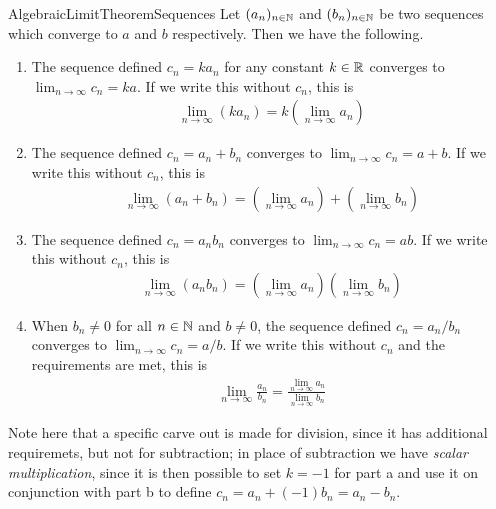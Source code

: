 \documentclass[11pt]{article}
\begin{document}
\begin{label theorem}{AlgebraicLimitTheoremSequences}
Let $(a_n)_{n\in \mathbb{N}}$ and $(b_n)_{n\in \mathbb{N}}$ be two sequences which converge to $a$ and $b$ respectively. Then we have the following. \begin{enumerate}
\item The sequence defined $c_n = k a_n$ for any constant $k \in \mathbb{R}$ converges to $\lim_{n \to \infty} c_n = ka$. If we write this without $c_n$, this is \begin{gather*}
\lim_{n \to \infty} (k a_n) = k \left( \lim_{n \to \infty} a_n \right)
\end{gather*}
\item The sequence defined $c_n = a_n + b_n$ converges to $\lim_{n \to \infty} c_n = a + b$. If we write this without $c_n$, this is \begin{gather*}
\lim_{n \to \infty} (a_n + b_n) = \left( \lim_{n \to \infty} a_n \right) + \left( \lim_{n \to \infty} b_n \right)
\end{gather*}
\item The sequence defined $c_n = a_n b_n$ converges to $\lim_{n \to \infty} c_n = a b$. If we write this without $c_n$, this is \begin{gather*}
\lim_{n \to \infty} (a_n b_n) = \left( \lim_{n \to \infty} a_n \right) \left( \lim_{n \to \infty} b_n \right)
\end{gather*}
\item When $b_n \neq 0$ for all $n\in \mathbb{N}$ and $b \neq 0$, the sequence defined $c_n = a_n / b_n$ converges to $\lim_{n \to \infty} c_n = a/b$. If we write this without $c_n$ and the requirements are met, this is \begin{gather*}
\lim_{n \to \infty} \frac{a_n}{b_n} = \frac{\lim_{n \to \infty} a_n }{\lim_{n \to \infty} b_n}
\end{gather*}
\end{enumerate}
\end{label theorem}

Note here that a specific carve out is made for division, since it has additional requiremets, but not for subtraction; in place of subtraction we have \emph{scalar multiplication}, since it is then possible to set $k = -1$ for part a and use it on conjunction with part b to define $c_n = a_n + (-1)b_n = a_n - b_n$.
\end{document}
